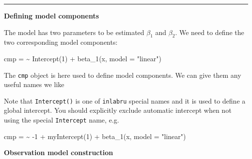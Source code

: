 \documentclass[
  letterpaper,
  DIV=11,
  numbers=noendperiod]{scrartcl}
\newenvironment{Shaded}{\begin{snugshade}}{\end{snugshade}}
\newcommand{\AttributeTok}[1]{\textcolor[rgb]{0.40,0.45,0.13}{#1}}
\newcommand{\DecValTok}[1]{\textcolor[rgb]{0.68,0.00,0.00}{#1}}
\newcommand{\ErrorTok}[1]{\textcolor[rgb]{0.68,0.00,0.00}{#1}}
\newcommand{\FunctionTok}[1]{\textcolor[rgb]{0.28,0.35,0.67}{#1}}
\newcommand{\NormalTok}[1]{\textcolor[rgb]{0.00,0.23,0.31}{#1}}
\newcommand{\OtherTok}[1]{\textcolor[rgb]{0.00,0.23,0.31}{#1}}
\newcommand{\SpecialCharTok}[1]{\textcolor[rgb]{0.37,0.37,0.37}{#1}}
\newcommand{\StringTok}[1]{\textcolor[rgb]{0.13,0.47,0.30}{#1}}
\begin{document}
\begin{center}\rule{0.5\linewidth}{0.5pt}\end{center}

\textbf{Defining model components}

The model has two parameters to be estimated \(\beta_1\) and
\(\beta_2\). We need to define the two corresponding model components:

\begin{Shaded}
\begin{Highlighting}[]
\NormalTok{cmp }\OtherTok{=}  \ErrorTok{\textasciitilde{}} \FunctionTok{Intercept}\NormalTok{(}\DecValTok{1}\NormalTok{) }\SpecialCharTok{+} \FunctionTok{beta\_1}\NormalTok{(x, }\AttributeTok{model =} \StringTok{"linear"}\NormalTok{)}
\end{Highlighting}
\end{Shaded}

The \texttt{cmp} object is here used to define model components. We can
give them any useful names we like

\begin{tcolorbox}[enhanced jigsaw, opacitybacktitle=0.6, rightrule=.15mm, colframe=quarto-callout-note-color-frame, leftrule=.75mm, opacityback=0, colback=white, bottomtitle=1mm, arc=.35mm, coltitle=black, titlerule=0mm, breakable, toptitle=1mm, left=2mm, toprule=.15mm, bottomrule=.15mm, title=\textcolor{quarto-callout-note-color}{\faInfo}\hspace{0.5em}{Note}, colbacktitle=quarto-callout-note-color!10!white]

Note that \texttt{Intercept()} is one of \texttt{inlabru} special names
and it is used to define a global intercept. You should explicitly
exclude automatic intercept when not using the special
\texttt{Intercept} name, e.g.

\begin{Shaded}
\begin{Highlighting}[]
\NormalTok{cmp }\OtherTok{=}  \ErrorTok{\textasciitilde{}} \SpecialCharTok{{-}}\DecValTok{1} \SpecialCharTok{+} \FunctionTok{myIntercept}\NormalTok{(}\DecValTok{1}\NormalTok{) }\SpecialCharTok{+} \FunctionTok{beta\_1}\NormalTok{(x, }\AttributeTok{model =} \StringTok{"linear"}\NormalTok{)}
\end{Highlighting}
\end{Shaded}

\end{tcolorbox}

\textbf{Observation model construction}
\end{document}
